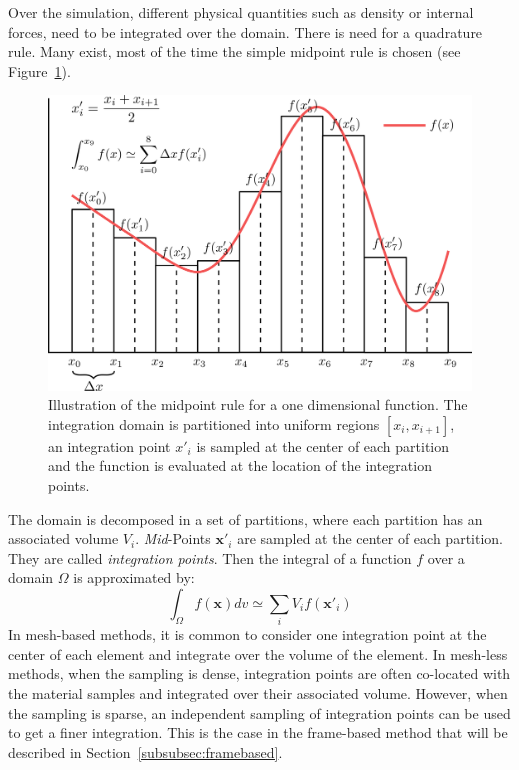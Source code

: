 Over the simulation, different physical quantities such as density or internal forces, need to be integrated over the domain. 
There is need for a quadrature rule. 
Many exist, most of the time the simple midpoint rule is chosen (see Figure~\ref{fig:spatialIntegration}). 
\begin{figure}[H]
	\centering
	\includegraphics[width=0.8\linewidth]{images/continuum_mechanics/spatialIntegration.png}
	\caption[STAR mechanics: Spatial integration]{\label{fig:spatialIntegration} Illustration of the midpoint rule for a one dimensional function. The integration domain is partitioned into uniform regions $\left[x_{i}, x_{i+1}\right]$, an integration point $x'_{i}$ is sampled at the center of each partition and the function is evaluated at the location of the integration points.}
\end{figure}
The domain is decomposed in a set of partitions, where each partition has an associated volume $V_{i}$. 
\emph{Mid}-Points $\mathbf{x'}_{i}$ are sampled at the center of each partition.
They are called \emph{integration points}. 
Then the integral of a function $f$ over a domain $\Omega$ is approximated by:
\begin{equation}
\label{eq:midpointRule}
\int_{\Omega} f(\mathbf{x})dv \simeq \sum_{i} V_{i}f(\mathbf{x'}_{i})
\end{equation}
In mesh-based methods, it is common to consider one integration point at the center of each element and integrate over the volume of the element.
In mesh-less methods, when the sampling is dense, integration points are often co-located with the material samples and integrated over their associated volume. 
However, when the sampling is sparse, an independent sampling of integration points can be used to get a finer integration.
This is the case in the frame-based method that will be described in Section~\ref{subsubsec:framebased}.

